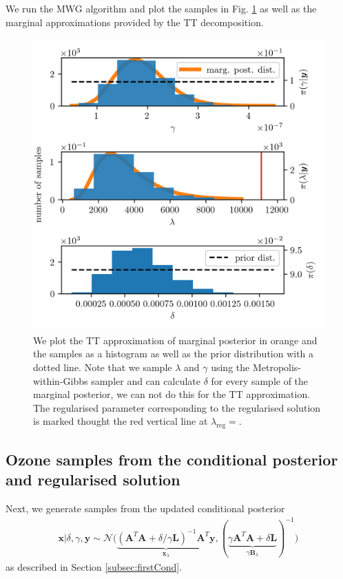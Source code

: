 We run the MWG algorithm and plot the samples in Fig. \ref{fig:MargPostHistTT} as well as the marginal approximations provided by the TT decomposition.
\begin{figure}[ht!]
	\centering
	\includegraphics{secSIRTMargMargO3Res.png}
	\caption[Marginal posterior histograms and TT approximation as well as hyper-prior distribution.]{We plot the TT approximation of marginal posterior in orange and the samples as a histogram as well as the prior distribution with a dotted line. Note that we sample $\lambda$ and $\gamma$ using the Metropolis-within-Gibbs sampler and can calculate $\delta$ for every sample of the marginal posterior, we can not do this for the TT approximation. The regularised parameter corresponding to the regularised solution is marked thought the red vertical line at $\lambda_{\text{reg}} =$.}
	\label{fig:MargPostHistTT}
\end{figure}



\subsection{Ozone samples from the conditional posterior and regularised solution}
Next, we generate samples from the updated conditional posterior
\begin{align}
	\bm{x}| \delta, \gamma, \bm{y}  \sim \mathcal{N}\big( \underbrace{ (\bm{A}^T \bm{A} + \delta / \gamma \bm{L} )^{-1} \bm{A}^T \bm{y}}_{\bm{x}_{\lambda}}, ( \underbrace{ \gamma \bm{A}^T \bm{A} + \delta \bm{L} }_{\gamma \bm{B}_{\lambda}}  )^{-1} \big) \, \label{eq:UpdCondPost}
\end{align}
as described in Section \ref{subsec:firstCond}.

